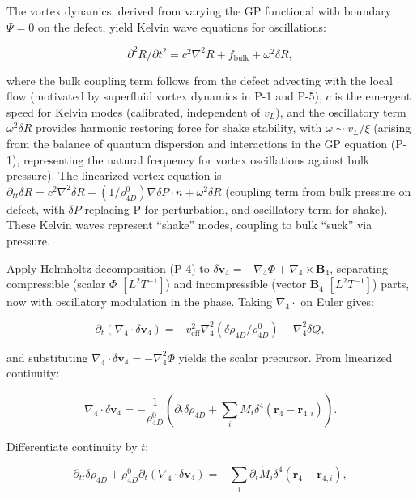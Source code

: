 The vortex dynamics, derived from varying the GP functional with boundary $\Psi=0$ on the defect, yield Kelvin wave equations for oscillations:

\begin{equation}
\partial^2 R / \partial t^2 = c^2 \nabla^2 R + f_{\text{bulk}} + \omega^2 \delta R,
\end{equation}

where the bulk coupling term follows from the defect advecting with the local flow (motivated by superfluid vortex dynamics in P-1 and P-5), $c$ is the emergent speed for Kelvin modes (calibrated, independent of $v_L$), and the oscillatory term $\omega^2 \delta R$ provides harmonic restoring force for shake stability, with $\omega \sim v_L / \xi$ (arising from the balance of quantum dispersion and interactions in the GP equation (P-1), representing the natural frequency for vortex oscillations against bulk pressure). The linearized vortex equation is $\partial_{tt} \delta R = c^2 \nabla^2 \delta R - (1 / \rho_{4D}^0) \nabla \delta P \cdot n + \omega^2 \delta R$ (coupling term from bulk pressure on defect, with $\delta P$ replacing P for perturbation, and oscillatory term for shake). These Kelvin waves represent ``shake'' modes, coupling to bulk ``suck'' via pressure.

Apply Helmholtz decomposition (P-4) to $\delta \mathbf{v}_4 = -\nabla_4 \Phi + \nabla_4 \times \mathbf{B}_4$, separating compressible (scalar $\Phi$ $[L^2 T^{-1}]$) and incompressible (vector $\mathbf{B}_4$ $[L^2 T^{-1}]$) parts, now with oscillatory modulation in the phase. Taking $\nabla_4 \cdot$ on Euler gives:

\begin{equation}
\partial_t (\nabla_4 \cdot \delta \mathbf{v}_4) = -v_{\text{eff}}^2 \nabla_4^2 (\delta \rho_{4D} / \rho_{4D}^0) - \nabla_4^2 \delta Q,
\end{equation}

and substituting $\nabla_4 \cdot \delta \mathbf{v}_4 = -\nabla_4^2 \Phi$ yields the scalar precursor. From linearized continuity:

\begin{equation}
\nabla_4 \cdot \delta \mathbf{v}_4 = -\frac{1}{\rho_{4D}^0} \left( \partial_t \delta \rho_{4D} + \sum_i \dot{M}_i \delta^4(\mathbf{r}_4 - \mathbf{r}_{4,i}) \right).
\end{equation}

Differentiate continuity by $t$:

\begin{equation}
\partial_{tt} \delta \rho_{4D} + \rho_{4D}^0 \partial_t (\nabla_4 \cdot \delta \mathbf{v}_4) = -\sum_i \partial_t \dot{M}_i \delta^4(\mathbf{r}_4 - \mathbf{r}_{4,i}),
\end{equation}

